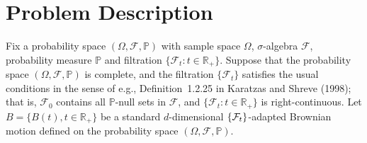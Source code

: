 \documentclass[11pt]{article}
\theoremstyle{definition}
\theoremstyle{plain}
\newcommand{\cF}{{\cal F}}
\begin{document}
\section{Problem Description}\label{sec:problem_description}
Fix a probability space $(\Omega, \mathcal{F}, \mathbb{P})$ with sample space $\Omega$, $\sigma$-algebra $\mathcal{F}$,  probability measure $\mathbb{P}$ 
and filtration $\{\mathcal{F}_t : t \in \mathbb{R}_+\}$.  
Suppose that the probability space $(\Omega, \mathcal{F}, \mathbb{P})$ is complete, and the filtration $\{\mathcal{F}_t\}$ satisfies the usual conditions 
in the sense of e.g., Definition~1.2.25 in Karatzas and Shreve (1998);  
that is, $\mathcal{F}_0$ contains all $\mathbb{P}$-null sets in $\mathcal{F}$, and $\{\mathcal{F}_t : t \in \mathbb{R}_+\}$ is right-continuous.
Let $B = \{B(t), t \in \mathbb{R}_+\}$ be a standard $d$-dimensional $\{\cF_t\}$-adapted Brownian motion defined on the probability space $(\Omega, \mathcal{F}, \mathbb{P})$.
\end{document}
